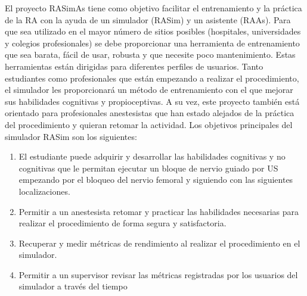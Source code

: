 



El proyecto \ac{RASimAs} tiene como objetivo  facilitar el entrenamiento y la práctica de la \ac{RA} con la ayuda de un simulador (\ac{RASim}) y un asistente (\ac{RAAs}).
Para que sea utilizado en el mayor número de sitios posibles (hospitales, universidades y colegios profesionales) se debe proporcionar una herramienta de entrenamiento que sea barata, fácil de usar, robusta y que necesite poco mantenimiento.
Estas herramientas están dirigidas para diferentes perfiles de usuarios.  Tanto estudiantes como profesionales que están empezando a realizar el procedimiento, el simulador les proporcionará un método de entrenamiento con el que mejorar sus habilidades cognitivas y propioceptivas. A su vez, este proyecto también está orientado para profesionales anestesistas que han estado alejados de la práctica del procedimiento y quieran retomar la actividad.
Los objetivos principales del simulador \ac{RASim} son los siguientes:
\begin{enumerate}
    \item El estudiante puede adquirir y desarrollar las habilidades cognitivas y no cognitivas que le permitan ejecutar un bloque de nervio guiado por \ac{US} empezando por el bloqueo del nervio femoral y siguiendo con las siguientes localizaciones.
    \item Permitir a un anestesista retomar y practicar las habilidades necesarias para realizar el procedimiento de forma segura y satisfactoria.
    \item Recuperar y medir métricas de rendimiento al realizar el procedimiento en el simulador. 
    \item Permitir a un supervisor revisar las métricas registradas por los usuarios del simulador a través del tiempo
\end{enumerate}










